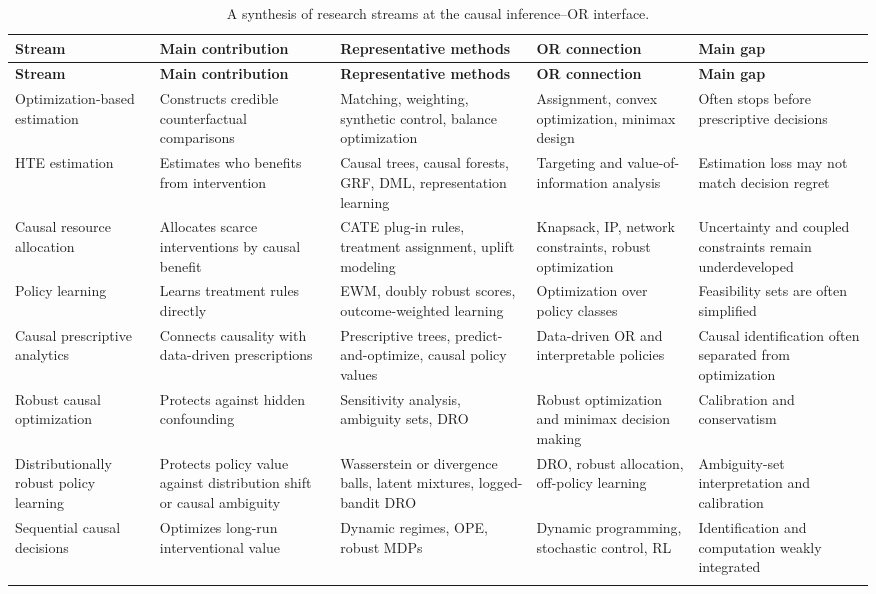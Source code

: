 \documentclass[11pt]{article}
\begin{document}
\begin{longtable}{p{} p{} p{} p{} p{}}
\toprule
\textbf{Stream} & \textbf{Main contribution} & \textbf{Representative methods} & \textbf{OR connection} & \textbf{Main gap} \\
\midrule
\endfirsthead
\toprule
\textbf{Stream} & \textbf{Main contribution} & \textbf{Representative methods} & \textbf{OR connection} & \textbf{Main gap} \\
\midrule
\endhead
Optimization-based estimation & Constructs credible counterfactual comparisons & Matching, weighting, synthetic control, balance optimization & Assignment, convex optimization, minimax design & Often stops before prescriptive decisions \\
HTE estimation & Estimates who benefits from intervention & Causal trees, causal forests, GRF, DML, representation learning & Targeting and value-of-information analysis & Estimation loss may not match decision regret \\
Causal resource allocation & Allocates scarce interventions by causal benefit & CATE plug-in rules, treatment assignment, uplift modeling & Knapsack, IP, network constraints, robust optimization & Uncertainty and coupled constraints remain underdeveloped \\
Policy learning & Learns treatment rules directly & EWM, doubly robust scores, outcome-weighted learning & Optimization over policy classes & Feasibility sets are often simplified \\
Causal prescriptive analytics & Connects causality with data-driven prescriptions & Prescriptive trees, predict-and-optimize, causal policy values & Data-driven OR and interpretable policies & Causal identification often separated from optimization \\
Robust causal optimization & Protects against hidden confounding & Sensitivity analysis, ambiguity sets, DRO & Robust optimization and minimax decision making & Calibration and conservatism \\
Distributionally robust policy learning & Protects policy value against distribution shift or causal ambiguity & Wasserstein or divergence balls, latent mixtures, logged-bandit DRO & DRO, robust allocation, off-policy learning & Ambiguity-set interpretation and calibration \\
Sequential causal decisions & Optimizes long-run interventional value & Dynamic regimes, OPE, robust MDPs & Dynamic programming, stochastic control, RL & Identification and computation weakly integrated \\
\bottomrule
\caption{A synthesis of research streams at the causal inference--OR interface.}
\end{longtable}
\end{document}
